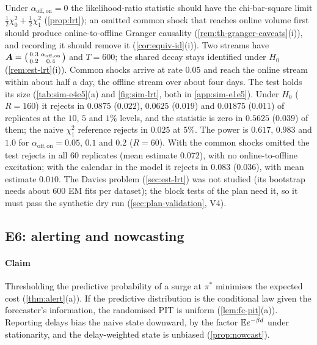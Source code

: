 Under $\alpha_{\mathrm{off},\mathrm{on}}=0$ the likelihood-ratio statistic should have the
chi-bar-square limit $\tfrac12\chi^2_0+\tfrac12\chi^2_1$ (\cref{prop:lrt}); an omitted
common shock that reaches online volume first should produce online-to-offline Granger
causality (\cref{rem:th-granger-caveats}(i)), and recording it should remove it
(\cref{cor:equiv-id}(i)). Two streams have
$\bm{A}=\bigl(\begin{smallmatrix}0.3&\alpha_{\mathrm{off},\mathrm{on}}\\0.2&0.4\end{smallmatrix}\bigr)$
and $T=600$; the shared decay stays identified under $H_0$ (\cref{rem:est-lrt}(i)). Common
shocks arrive at rate $0.05$ and reach the online stream within about half a day, the
offline stream over about four days. The test holds its size (\cref{tab:sim-e4e5}(a) and \cref{fig:sim-lrt}, both in
\cref{app:sim-e1e5}). Under $H_0$ ($R=160$) it rejects in $0.0875$ ($0.022$), $0.0625$
($0.019$) and $0.01875$ ($0.011$) of replicates at the $10$, $5$ and $1\%$ levels, and the
statistic is zero in $0.5625$ ($0.039$) of them; the naive $\chi^2_1$ reference rejects in
$0.025$ at $5\%$. The power is $0.617$, $0.983$ and $1.0$ for
$\alpha_{\mathrm{off},\mathrm{on}}=0.05$, $0.1$ and $0.2$ ($R=60$). With the common shocks
omitted the test rejects in all 60 replicates (mean estimate $0.072$), with no
online-to-offline excitation; with the calendar in the model it rejects in $0.083$
($0.036$), with mean estimate $0.010$. The Davies problem (\cref{sec:est-lrt}) was not
studied (its bootstrap needs about 600 EM fits per dataset); the block tests of the plan
need it, so it must pass the synthetic dry run (\cref{sec:plan-validation}, V4).

\subsection{E6: alerting and nowcasting}\label{sec:sim-alert}

\paragraph{Claim} Thresholding the predictive probability of a surge at $\pi^*$ minimises
the expected cost (\cref{thm:alert}(a)). If the predictive distribution is the conditional
law given the forecaster's information, the randomised PIT is uniform
(\cref{lem:fc-pit}(a)). Reporting delays bias the naive state downward, by the factor
$\mathbb{E} e^{-\beta d}$ under stationarity, and the delay-weighted state is unbiased
(\cref{prop:nowcast}).

